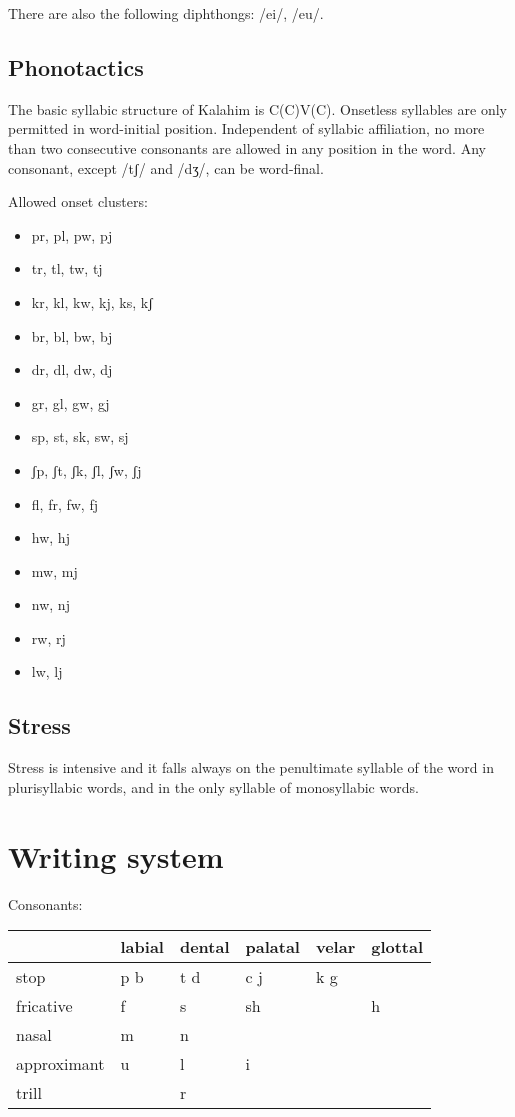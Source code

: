 \documentclass[a4paper,]{article}
\providecommand{\tightlist}{%
  \setlength{\itemsep}{0pt}\setlength{\parskip}{0pt}}
\begin{document}
There are also the following diphthongs: /ei/, /eu/.

\hypertarget{phonotactics}{%
\subsection{Phonotactics}\label{phonotactics}}

The basic syllabic structure of Kalahim is C(C)V(C). Onsetless syllables
are only permitted in word-initial position. Independent of syllabic
affiliation, no more than two consecutive consonants are allowed in any
position in the word. Any consonant, except /tʃ/ and /dʒ/, can be
word-final.

Allowed onset clusters:

\begin{itemize}
\tightlist
\item
  pr, pl, pw, pj
\item
  tr, tl, tw, tj
\item
  kr, kl, kw, kj, ks, kʃ
\item
  br, bl, bw, bj
\item
  dr, dl, dw, dj
\item
  gr, gl, gw, gj
\item
  sp, st, sk, sw, sj
\item
  ʃp, ʃt, ʃk, ʃl, ʃw, ʃj
\item
  fl, fr, fw, fj
\item
  hw, hj
\item
  mw, mj
\item
  nw, nj
\item
  rw, rj
\item
  lw, lj
\end{itemize}

\hypertarget{stress}{%
\subsection{Stress}\label{stress}}

Stress is intensive and it falls always on the penultimate syllable of
the word in plurisyllabic words, and in the only syllable of
monosyllabic words.

\hypertarget{writing-system}{%
\section{Writing system}\label{writing-system}}

Consonants:

\begin{longtable}[]{@{}llllll@{}}
\toprule
& labial & dental & palatal & velar & glottal\tabularnewline
\midrule
\endhead
stop & p b & t d & c j & k g &\tabularnewline
fricative & f & s & sh & & h\tabularnewline
nasal & m & n & & &\tabularnewline
approximant & u & l & i & &\tabularnewline
trill & & r & & &\tabularnewline
\bottomrule
\end{longtable}
\end{document}
